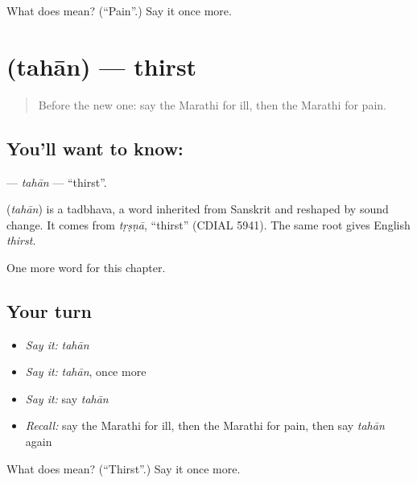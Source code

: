 \begin{tcolorbox}[breakable,colback=teal!4,colframe=teal!35!black,title={Before you move on}]
What does  mean? (\textquotedblleft{}Pain\textquotedblright{}.) Say it once more.
\end{tcolorbox}
\section[\texorpdfstring{\mr{तहान} (tahān)}{तहान (tahān)}]{ (tahān) — thirst}

\label{lesson:MR-C73-tahan}



\begin{quote}
Before the new one: say the Marathi for ill, then the Marathi for pain.
\end{quote}

\subsection*{You'll want to know: }
\textbf{} — \emph{tahān} — \textquotedblleft{}thirst\textquotedblright{}.

\begin{cousinweb}
\textbf{} (\emph{tahān}) is a tadbhava, a word inherited from Sanskrit and reshaped by sound change. It comes from \emph{tṛṣṇā}, \textquotedblleft{}thirst\textquotedblright{} (CDIAL 5941). The same root gives English \emph{thirst}.
\end{cousinweb}

\begin{grammarlens}[title={What you've built}]
One more word for this chapter.
\end{grammarlens}

\subsection*{Your turn}
\begin{itemize}
\raggedright
  \item \emph{Say it:} \emph{tahān}
  \item \emph{Say it:} \emph{tahān}, once more
  \item \emph{Say it:} say \emph{tahān}
  \item \emph{Recall:} say the Marathi for ill, then the Marathi for pain, then say \emph{tahān} again
\end{itemize}

\begin{tcolorbox}[breakable,colback=teal!4,colframe=teal!35!black,title={Before you move on}]
What does  mean? (\textquotedblleft{}Thirst\textquotedblright{}.) Say it once more.
\end{tcolorbox}
